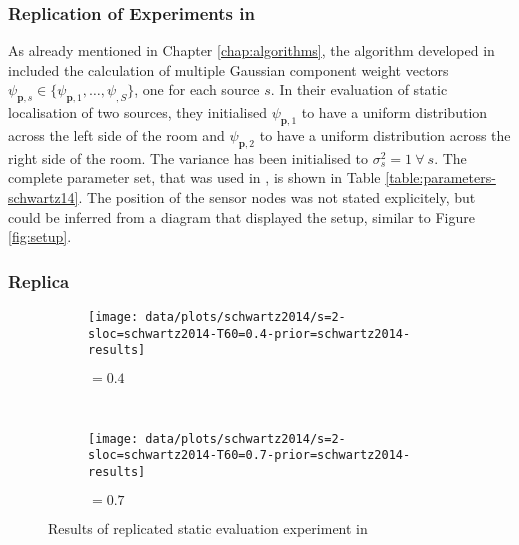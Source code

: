 \subsubsection{Replication of Experiments in \citeauthor{Schwartz2014} \citeyearpar{Schwartz2014}}
As already mentioned in Chapter \ref{chap:algorithms}, the algorithm developed in \cite{Schwartz2014} included the calculation of multiple Gaussian component weight vectors $\psi_{\bm p, s}\in \{\psi_{\bm p, 1}, \dots, \psi_{\bm, S}\}$, one for each source $s$. In their evaluation of static localisation of two sources, they initialised $\psi_{\bm p, 1}$ to have a uniform distribution across the left side of the room and $\psi_{\bm p, 2}$ to have a uniform distribution across the right side of the room. The variance has been initialised to $\sigma^2_s=1\ \forall\ s$. The complete parameter set, that was used in \cite{Schwartz2014}, is shown in Table \ref{table:parameters-schwartz14}. The position of the sensor nodes was not stated explicitely, but could be inferred from a diagram that displayed the setup, similar to Figure \ref{fig:setup}.				




\subsubsection*{Replica}
\begin{figure}[!htb]
 \centering
 \begin{subfigure}{\textwidth}
    \texttt{[image: data/plots/schwartz2014/s=2-sloc=schwartz2014-T60=0.4-prior=schwartz2014-results]}
    \caption{\Tsixty$=0.4$}
 \end{subfigure}\\
 \begin{subfigure}{\textwidth}
    \texttt{[image: data/plots/schwartz2014/s=2-sloc=schwartz2014-T60=0.7-prior=schwartz2014-results]}
    \caption{\Tsixty$=0.7$}
 \end{subfigure}
 \caption{Results of replicated static evaluation experiment in \cite{Schwartz2014}}
\end{figure}